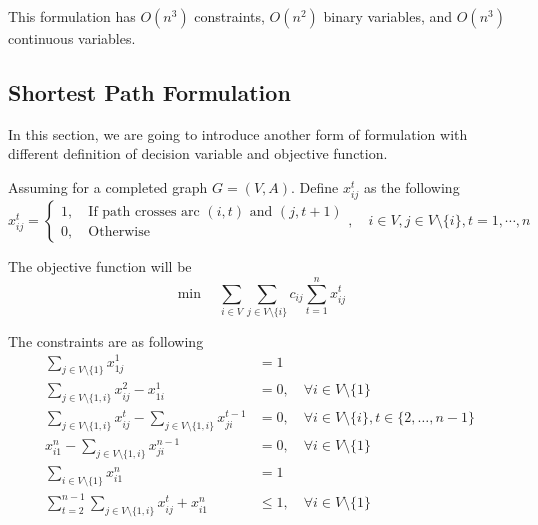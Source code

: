 					This formulation has $O(n^3)$ constraints, $O(n^2)$ binary variables, and $O(n^3)$ continuous variables.

				\subsection{Shortest Path Formulation}

					In this section, we are going to introduce another form of formulation with different definition of decision variable and objective function.

					Assuming for a completed graph $G = (V, A)$. Define $x_{ij}^t$ as the following
					\begin{equation}
						x_{ij}^t = \begin{cases}
										1, \quad \text{If path crosses arc } (i, t) \text{ and } (j, t + 1) \\
										0, \quad \text{Otherwise}
									\end{cases}, \quad i \in V, j \in V \setminus \{i\}, t = 1, \cdots, n
					\end{equation}

					The objective function will be
					\begin{equation}
						\min \quad \sum_{i \in V}\sum_{j \in V\setminus \{i\}} c_{ij} \sum_{t = 1}^n x_{ij}^t
					\end{equation}

					The constraints are as following
					\begin{align}
						\sum_{j \in V \setminus \{1\}} x_{1j}^1 &= 1 \label{TSP:con:SPFStart}\\
						\sum_{j \in V \setminus \{1, i\}} x_{ij}^2 - x_{1i}^1 &= 0, \quad \forall i \in V \setminus \{1\} \label{TSP:con:SPFFirstLayer}\\
						\sum_{j \in V \setminus \{1, i\}} x_{ij}^t - \sum_{j \in V \setminus \{1, i\}} x_{ji}^{t - 1} &= 0, \quad \forall i \in V \setminus \{i\}, t \in \{2, \dots, n - 1\} \label{TSP:con:SPFTthLayer}\\
						x_{i1}^n - \sum_{j \in V \setminus \{1, i\}} x_{ji}^{n - 1} &= 0, \quad \forall i \in V \setminus \{1\} \label{TSP:con:SPFLastLayer}\\
						\sum_{i \in V \setminus \{1\}} x_{i1}^n &= 1 \label{TSP:con:SPFEnd}\\
						\sum_{t = 2}^{n - 1}\sum_{j \in V \setminus \{1, i\}} x_{ij}^t + x_{i1}^n & \le 1, \quad \forall i \in V \setminus \{1\} \label{TSP:con:SPFSameType1}
					\end{align}

